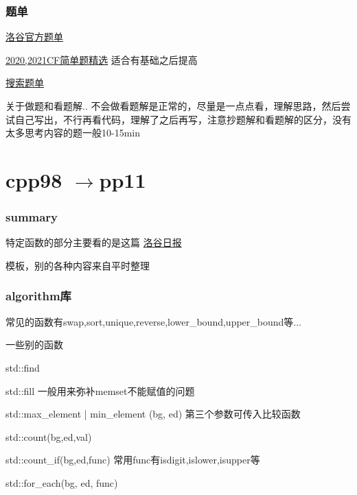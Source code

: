 \documentclass{beamer}
\begin{document}
  \begin{frame}
    \frametitle{题单}
    \href{https://www.luogu.com.cn/training/list?type=official&page=1}{洛谷官方题单}

    \href{https://www.luogu.com.cn/training/2018}{2020,2021CF简单题精选} 适合有基础之后提高

    \vspace*{1\baselineskip}
    
    \href{https://www.luogu.com.cn/training/9376}{搜索题单}
    
    \vspace*{1\baselineskip}
    
    关于做题和看题解.. 不会做看题解是正常的，尽量是一点点看，理解思路，然后尝试自己写出，不行再看代码，理解了之后再写，注意抄题解和看题解的区分，没有太多思考内容的题一般10-15min
  \end{frame}

  \section{cpp98 \texorpdfstring{$\to$} cpp11}

  \begin{frame}  
    \frametitle{summary}
    特定函数的部分主要看的是这篇
    \href{https://www.luogu.com.cn/blog/AccRobin/grammar-candies}{洛谷日报}
  
    \vspace*{2\baselineskip}
  
    模板，别的各种内容来自平时整理
  
  \end{frame}
  
  \begin{frame}
    \frametitle{algorithm库}
    常见的函数有swap,sort,unique,reverse,lower\_bound,upper\_bound等...
    
    一些别的函数

    std::find

    std::fill 一般用来弥补memset不能赋值的问题

    std::max\_element | min\_element (bg, ed) 第三个参数可传入比较函数

    std::count(bg,ed,val)
  
    std::count\_if(bg,ed,func) 常用func有isdigit,islower,isupper等

    std::for\_each(bg, ed, func)
  \end{frame}
\end{document}
